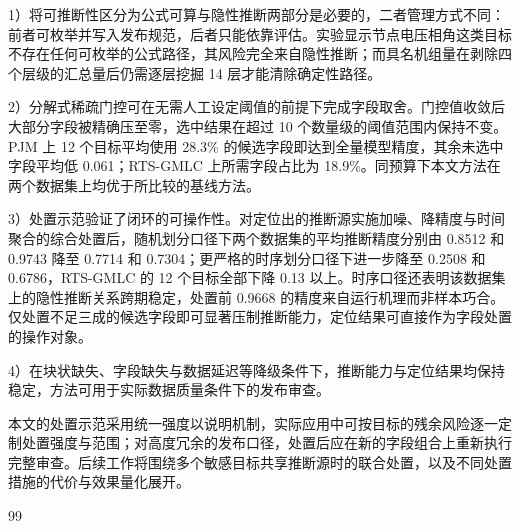 \documentclass[UTF8,zihao=5,twoside]{ctexart}
\begin{document}
1）将可推断性区分为公式可算与隐性推断两部分是必要的，二者管理方式不同：前者可枚举并写入发布规范，后者只能依靠评估。实验显示节点电压相角这类目标不存在任何可枚举的公式路径，其风险完全来自隐性推断；而具名机组量在剥除四个层级的汇总量后仍需逐层挖掘 14 层才能清除确定性路径。

2）分解式稀疏门控可在无需人工设定阈值的前提下完成字段取舍。门控值收敛后大部分字段被精确压至零，选中结果在超过 10 个数量级的阈值范围内保持不变。PJM 上 12 个目标平均使用 28.3\% 的候选字段即达到全量模型精度，其余未选中字段平均低 0.061；RTS-GMLC 上所需字段占比为 18.9\%。同预算下本文方法在两个数据集上均优于所比较的基线方法。

3）处置示范验证了闭环的可操作性。对定位出的推断源实施加噪、降精度与时间聚合的综合处置后，随机划分口径下两个数据集的平均推断精度分别由 0.8512 和 0.9743 降至 0.7714 和 0.7304；更严格的时序划分口径下进一步降至 0.2508 和 0.6786，RTS-GMLC 的 12 个目标全部下降 0.13 以上。时序口径还表明该数据集上的隐性推断关系跨期稳定，处置前 0.9668 的精度来自运行机理而非样本巧合。仅处置不足三成的候选字段即可显著压制推断能力，定位结果可直接作为字段处置的操作对象。

4）在块状缺失、字段缺失与数据延迟等降级条件下，推断能力与定位结果均保持稳定，方法可用于实际数据质量条件下的发布审查。

本文的处置示范采用统一强度以说明机制，实际应用中可按目标的残余风险逐一定制处置强度与范围；对高度冗余的发布口径，处置后应在新的字段组合上重新执行完整审查。后续工作将围绕多个敏感目标共享推断源时的联合处置，以及不同处置措施的代价与效果量化展开。

\begin{thebibliography}{99}

\end{thebibliography}

\vspace{0.6em}
\end{document}
